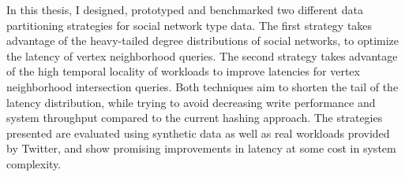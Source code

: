 % 
% 
%

In this thesis, I designed, prototyped and benchmarked two different data partitioning strategies for social network type data. The first strategy takes advantage of  the heavy-tailed degree distributions of social networks, to optimize the latency of vertex neighborhood queries. The second strategy takes advantage of the high temporal locality of workloads to improve latencies for vertex neighborhood intersection queries. Both techniques aim to shorten the tail of the latency distribution, while trying to avoid decreasing write performance and system throughput compared to the current hashing approach. The strategies presented are evaluated using synthetic data as well as real workloads provided by Twitter, and show promising improvements in latency at some cost in system complexity.

